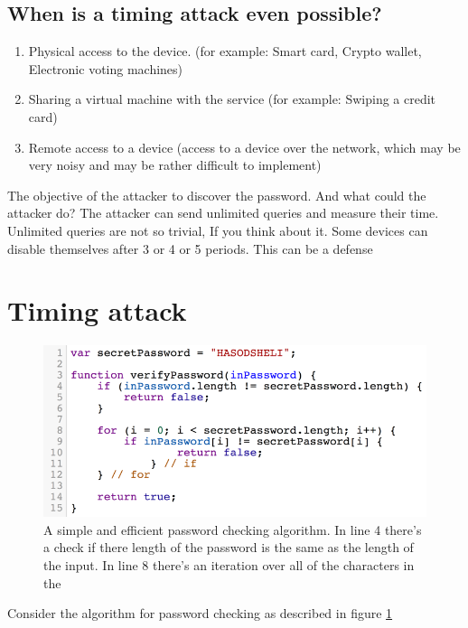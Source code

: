 \subsection{When is a timing attack even possible?}
\begin{enumerate}
    \item Physical access to the device.
    (for example: Smart card, Crypto wallet, Electronic voting machines)
    \item Sharing a virtual machine with the service
    (for example: Swiping a credit card)
    \item Remote access to a device (access to a device over the network, which may be very noisy and may be rather difficult to implement)
\end{enumerate}

The objective of the attacker to discover the password. And what could the attacker do? The attacker can send unlimited queries and measure their time. Unlimited queries are not so trivial, If you think about it. Some devices can disable themselves after 3 or 4 or 5 periods. This can be a defense~\cite{ATM_bruteforce_block}

\section{Timing attack}

\begin{figure}[H]
    \centering
    \includegraphics{images/chapter_1/password_check_algo_1.png}
    \caption{A simple and efficient password checking algorithm.
    In line 4 there's a check if there length of the password is the same as the length of the input.
    In line 8 there's an iteration over all of the characters in the }
    \label{c1_fig_pass_check_1}
\end{figure}

Consider the algorithm for password checking as described in figure \ref{c1_fig_pass_check_1}

